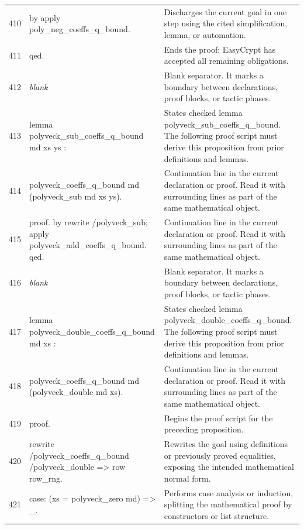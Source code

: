 \documentclass[10pt]{article}
\begin{document}
\begin{longtable}{r L{0.53\textwidth} L{0.37\textwidth}}
410 & {\ttfamily\scriptsize by apply poly\_neg\_coeffs\_q\_bound.} & Discharges the current goal in one step using the cited simplification, lemma, or automation. \\
411 & {\ttfamily\scriptsize qed.} & Ends the proof; EasyCrypt has accepted all remaining obligations. \\
412 & {\ttfamily\scriptsize \emph{blank}} & Blank separator.  It marks a boundary between declarations, proof blocks, or tactic phases. \\
413 & {\ttfamily\scriptsize lemma polyveck\_sub\_coeffs\_q\_bound md xs ys :} & States checked lemma polyveck\_sub\_coeffs\_q\_bound.  The following proof script must derive this proposition from prior definitions and lemmas. \\
414 & {\ttfamily\scriptsize   polyveck\_coeffs\_q\_bound md (polyveck\_sub md xs ys).} & Continuation line in the current declaration or proof.  Read it with surrounding lines as part of the same mathematical object. \\
415 & {\ttfamily\scriptsize proof. by rewrite /polyveck\_sub; apply polyveck\_add\_coeffs\_q\_bound. qed.} & Continuation line in the current declaration or proof.  Read it with surrounding lines as part of the same mathematical object. \\
416 & {\ttfamily\scriptsize \emph{blank}} & Blank separator.  It marks a boundary between declarations, proof blocks, or tactic phases. \\
417 & {\ttfamily\scriptsize lemma polyveck\_double\_coeffs\_q\_bound md xs :} & States checked lemma polyveck\_double\_coeffs\_q\_bound.  The following proof script must derive this proposition from prior definitions and lemmas. \\
418 & {\ttfamily\scriptsize   polyveck\_coeffs\_q\_bound md (polyveck\_double md xs).} & Continuation line in the current declaration or proof.  Read it with surrounding lines as part of the same mathematical object. \\
419 & {\ttfamily\scriptsize proof.} & Begins the proof script for the preceding proposition. \\
420 & {\ttfamily\scriptsize rewrite /polyveck\_coeffs\_q\_bound /polyveck\_double => row row\_rng.} & Rewrites the goal using definitions or previously proved equalities, exposing the intended mathematical normal form. \\
421 & {\ttfamily\scriptsize case: (xs = polyveck\_zero md) => \_.} & Performs case analysis or induction, splitting the mathematical proof by constructors or list structure. \\

\end{longtable}
\end{document}
